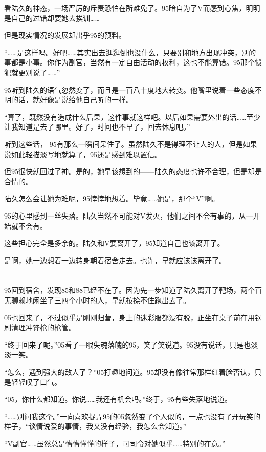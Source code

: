 看陆久的神态，一场严厉的斥责恐怕在所难免了。95暗自为了V而感到心焦，明明是自己的过错却要她去挨训……

但是现实情况的发展却出乎95的预料。

“……是这样吗。好吧……其实出去逛逛倒也没什么，只要别和地方出现冲突，别的事都是小事。你作为副官，当然有一定自由活动的权利，这也不能算错。95那个惯犯就更别说了……”

95听到陆久的语气忽然变了，而且是一百八十度地大转变。他嘴里说着一些态度不明的话，就好像是说给他自己听的一样。

“算了，既然没有造成什么后果，这件事就这样吧。以后如果需要外出的话……至少让我知道是去了哪里。好了，时间也不早了，回去休息吧。”

听到这些话， 95有那么一瞬间呆住了。虽然陆久不是得理不让人的人，但是如果说如此轻描淡写地就算了，95还是感到难以置信。

但95很快就回过了神。是的，她早该想到的——陆久的态度也许不合理，但是却是合情的。

陆久怎么会让她为难呢，95悻悻地想着。毕竟……她是，那个“V”啊。

95的心里感到一丝失落。陆久当然不可能对V发火，他们之间不会有事的，从一开始就不会有。

这些担心完全是多余的。陆久和V要离开了，95知道自己也该离开了。

是啊，她一边想着一边转身朝着宿舍走去。也许，早就应该该离开了。



\section*{}

95回到宿舍，发现85和88已经不在了。因为先一步知道了陆久离开了靶场，两个百无聊赖地闲坐了三四个小时的人，早就按捺不住跑出去了。

05也回来了，不过似乎是刚刚归营，身上的迷彩服都没有脱，正坐在桌子前在用钢刷清理冲锋枪的枪管。

“终于回来了呢。”05看了一眼失魂落魄的95，笑了笑说道。95没有说话，只是也淡淡一笑。

“怎么，遇到强大的敌人了？”05打趣地问道。95却没有像往常那样红着脸否认，只是轻轻叹了口气。

“05，你什么都知道。你说……我还有机会吗。”终于，95有些失落地说道。

“……别问我这个。”一向喜欢捉弄95的05忽然变了个人似的，一点也没有了开玩笑的样子，“谈情说爱的事情，我又没有经验，我怎么会知道。”

“V副官……虽然总是懵懵懂懂的样子，可司令对她似乎……特别的在意。”


